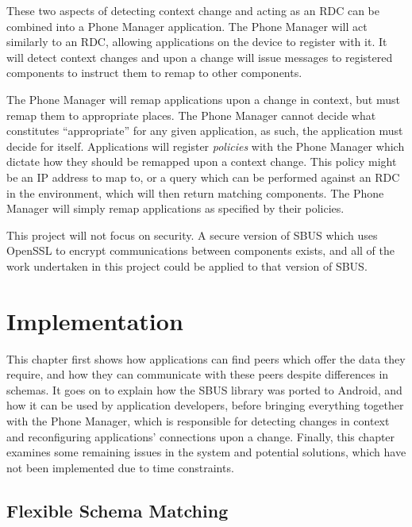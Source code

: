 \documentclass[12pt,twoside,notitlepage]{report}
\begin{document}
These two aspects of detecting context change and acting as an RDC can be combined into a Phone Manager application. 
The Phone Manager will act similarly to an RDC, allowing applications on the device to register with it. 
It will detect context changes and upon a change will issue messages to registered components to instruct them to remap to other components.

The Phone Manager will remap applications upon a change in context, but must remap them to appropriate places. 
The Phone Manager cannot decide what constitutes ``appropriate'' for any given application, as such, the application must decide for itself. 
Applications will register {\sl policies} with the Phone Manager which dictate how they should be remapped upon a context change. 
This policy might be an IP address to map to, or a query which can be performed against an RDC in the environment, which will then return matching components. 
The Phone Manager will simply remap applications as specified by their policies.

This project will not focus on security. 
A secure version of SBUS which uses OpenSSL to encrypt communications between components exists, and all of the work undertaken in this project could be applied to that version of SBUS.

\cleardoublepage


\chapter{Implementation}

This chapter first shows how applications can find peers which offer the data they require, and how they can communicate with these peers despite differences in schemas. 
It goes on to explain how the SBUS library was ported to Android, and how it can be used by application developers, before bringing everything together with the Phone Manager, which is responsible for detecting changes in context and reconfiguring applications' connections upon a change.
Finally, this chapter examines some remaining issues in the system and potential solutions, which have not been implemented due to time constraints. 

\section{Flexible Schema Matching}
\end{document}
